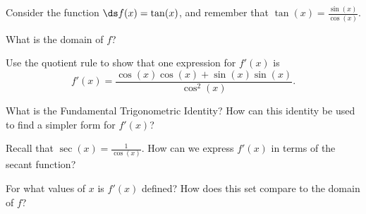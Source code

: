\begin{pa} \label{PA:2.4}
Consider the function $\ds f(x) = \tan(x)$, and remember that $\tan(x) = \frac{\sin(x)}{\cos(x)}$.
\ba
	\item What is the domain of $f$?
	\item Use the quotient rule to show that one expression for $f'(x)$ is
	$$f'(x) = \frac{\cos(x)\cos(x) + \sin(x)\sin(x)}{\cos^2(x)}.$$
	\item What is the Fundamental Trigonometric Identity?  How can this identity be used to find a simpler form for $f'(x)$?
	\item Recall that $\sec(x) = \frac{1}{\cos(x)}$.  How can we express $f'(x)$ in terms of the secant function?
	\item For what values of $x$ is $f'(x)$ defined?  How does this set compare to the domain of $f$?
\ea
\end{pa} 
\afterpa